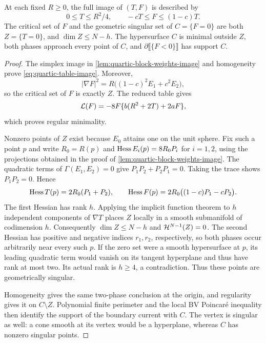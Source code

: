 \begin{lemma}
\label{lem:quartic-table-geometry}
At each fixed $R\geq0$, the full image of $(T,F)$ is
described by
\begin{equation}\label{eq:quartic-table-image}
 0\leq T\leq R^2/4,\qquad -cT\leq F\leq(1-c)T.
\end{equation}
The critical set of $F$ and the geometric singular set of
$C=\{F=0\}$ are both $Z=\{T=0\}$, and
$\dim Z\leq N-h$.  The hypersurface $C$ is minimal outside $Z$,
both phases approach every point of $C$, and
$\partial\llbracket\{F<0\}\rrbracket$ has support $C$.
\end{lemma}

\begin{proof}
The simplex image in \cref{lem:quartic-block-weights-image} and
homogeneity prove \eqref{eq:quartic-table-image}. Moreover,
\[
 |\nabla F|^2=R\bigl((1-c)^2E_1+c^2E_2\bigr),
\]
so the critical set of $F$ is exactly $Z$.  The reduced table gives
\begin{equation}\label{bh:minimality}
 \mathcal L(F)=-8F\{b(R^2+2T)+2aF\},
\end{equation}
which proves regular minimality.

Nonzero points of $Z$ exist because $E_0$ attains one on the unit
sphere. Fix such a point $p$ and write $R_0=R(p)$ and
$\operatorname{Hess} E_i(p)=8R_0P_i$ for $i=1,2$, using the projections obtained
in the proof of \cref{lem:quartic-block-weights-image}. The quadratic terms of
$\Gamma(E_1,E_2)=0$ give $P_1P_2+P_2P_1=0$.  Taking the trace
shows $P_1P_2=0$.  Hence
\[
 \operatorname{Hess} T(p)=2R_0(P_1+P_2),\qquad
 \operatorname{Hess} F(p)=2R_0\bigl((1-c)P_1-cP_2\bigr).
\]
The first Hessian has rank $h$.  Applying the implicit function
theorem to $h$ independent components of $\nabla T$ places $Z$
locally in a smooth submanifold of codimension $h$.  Consequently
$\dim Z\leq N-h$ and $\mathcal H^{N-1}(Z)=0$.
The second Hessian has positive and negative indices $r_1,r_2$,
respectively, so both phases occur arbitrarily near every such $p$.
If the zero set were a smooth hypersurface at $p$, its leading
quadratic term would vanish on its tangent hyperplane and thus have
rank at most two.  Its actual rank is $h\geq4$, a contradiction.
Thus these points are geometrically singular.

Homogeneity gives the same two-phase conclusion at the origin,
and regularity gives it on $C\setminus Z$.  Polynomial finite
perimeter and the local BV Poincar\'e inequality then identify the
support of the boundary current with $C$.  The vertex is singular
as well: a cone smooth at its vertex would be a hyperplane, whereas
$C$ has nonzero singular points.
\end{proof}

